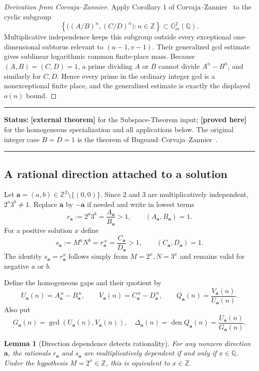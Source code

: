\documentclass[11pt,oneside]{article}
\newtheorem{lemma}[theorem]{Lemma}
\theoremstyle{definition}
\theoremstyle{remark}
\newcommand{\Z}{\mathbb Z}
\newcommand{\Q}{\mathbb Q}
\newcommand{\Gm}{\mathbb G_m}
\newcommand{\den}{\operatorname{den}}
\newcommand{\statusproved}{\textcolor{proofgreen}{\textbf{[proved here]}}}
\newcommand{\statusexternal}{\textcolor{deepblue}{\textbf{[external theorem]}}}
\newenvironment{statusbox}[1]
{\begin{center}\begin{minipage}{0.94\textwidth}\hrule\vspace{0.45em}\textbf{Status:} #1\par\vspace{0.35em}}
{\vspace{0.35em}\hrule\end{minipage}\end{center}}
\begin{document}
\begin{proof}[Derivation from Corvaja--Zannier]
Apply Corollary 1 of Corvaja--Zannier~\cite{CorvajaZannier2005} to the cyclic subgroup
\[
 \left\{\bigl((A/B)^n,(C/D)^n\bigr):n\in\Z\right\}\subset\Gm^2(\Q).
\]
Multiplicative independence keeps this subgroup outside every exceptional one-dimensional
subtorus relevant to $(u-1,v-1)$.  Their generalized gcd estimate gives sublinear logarithmic
common finite-place mass.  Because $(A,B)=(C,D)=1$, a prime dividing $A$ or $B$ cannot divide
$A^n-B^n$, and similarly for $C,D$.  Hence every prime in the ordinary integer gcd is a
nonexceptional finite place, and the generalized estimate is exactly the displayed
$o(n)$ bound.
\end{proof}

\begin{statusbox}{\statusexternal{} for the Subspace-Theorem input;
\statusproved{} for the homogeneous specialization and all applications below.  The original
integer case $B=D=1$ is the theorem of Bugeaud--Corvaja--Zannier~\cite{BCZ2003}.}
\end{statusbox}

\subsection{A rational direction attached to a solution}

Let $\mathbf a=(a,b)\in\Z^2\setminus\{(0,0)\}$.  Since $2$ and $3$ are
multiplicatively independent, $2^a3^b\ne1$.  Replace $\mathbf a$ by $-\mathbf a$ if needed
and write in lowest terms
\[
 r_{\mathbf a}:=2^a3^b=\frac{A_{\mathbf a}}{B_{\mathbf a}}>1,
 \qquad (A_{\mathbf a},B_{\mathbf a})=1.
\]
For a positive solution $x$ define
\[
 s_{\mathbf a}:=M^aN^b=r_{\mathbf a}^{\,x}
 =\frac{C_{\mathbf a}}{D_{\mathbf a}}>1,
 \qquad(C_{\mathbf a},D_{\mathbf a})=1.
\]
The identity $s_{\mathbf a}=r_{\mathbf a}^x$ follows simply from
$M=2^x,N=3^x$ and remains valid for negative $a$ or $b$.

Define the homogeneous gaps and their quotient by
\[
 U_{\mathbf a}(n)=A_{\mathbf a}^{\,n}-B_{\mathbf a}^{\,n},
 \qquad
 V_{\mathbf a}(n)=C_{\mathbf a}^{\,n}-D_{\mathbf a}^{\,n},
 \qquad
 Q_{\mathbf a}(n)=\frac{V_{\mathbf a}(n)}{U_{\mathbf a}(n)}.
\]
Also put
\[
 G_{\mathbf a}(n)=\gcd(U_{\mathbf a}(n),V_{\mathbf a}(n)),
 \quad
 \Delta_{\mathbf a}(n)=\den Q_{\mathbf a}(n)
 =\frac{U_{\mathbf a}(n)}{G_{\mathbf a}(n)}.
\]

\begin{lemma}[Direction dependence detects rationality]
\label{lem:direction-dependence}
For any nonzero direction $\mathbf a$, the rationals $r_{\mathbf a}$ and
$s_{\mathbf a}$ are multiplicatively dependent if and only if $x\in\Q$.  Under the
hypothesis $M=2^x\in\Z$, this is equivalent to $x\in\Z$.
\end{lemma}
\end{document}

